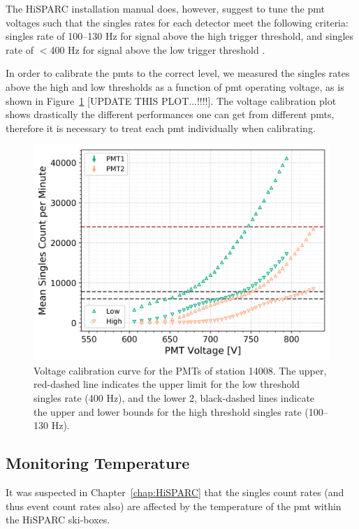 The HiSPARC installation manual does, however, suggest to tune the \gls{pmt} voltages such that the singles rates for each detector meet the following criteria: singles rate of 100--130 Hz for signal above the high trigger threshold, and singles rate of $<$400 Hz for signal above the low trigger threshold \citep{fokkema_hisparc_2019}.

In order to calibrate the \glspl{pmt} to the correct level, we measured the singles rates above the high and low thresholds as a function of \gls{pmt} operating voltage, as is shown in Figure~\ref{fig:PMT_cal} [UPDATE THIS PLOT...!!!!]. The voltage calibration plot shows drastically the different performances one can get from different \glspl{pmt}, therefore it is necessary to treat each \gls{pmt} individually when calibrating.

\begin{figure}
	\centering
	\includegraphics[width=0.75\columnwidth]{both_PMTs_post_NIM.png}
	\caption{Voltage calibration curve for the PMTs of station 14008. The upper, red-dashed line indicates the upper limit for the low threshold singles rate (400 Hz), and the lower 2, black-dashed lines indicate the upper and lower bounds for the high threshold singles rate (100--130 Hz).}
	\label{fig:PMT_cal}
\end{figure}




\subsection{Monitoring Temperature}

It was suspected in Chapter~\ref{chap:HiSPARC} that the singles count rates (and thus event count rates also) are affected by the temperature of the \gls{pmt} within the HiSPARC ski-boxes.

